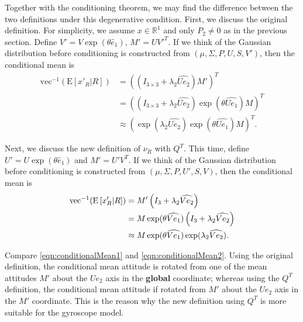 \documentclass[10pt,twocolumn]{article}
\newcommand{\expect}[1]{\ensuremath{\mathrm{E}\left[ #1 \right]}}
\newcommand{\real}[1]{\ensuremath{\mathbb{R}^{ #1 }}}
\begin{document}
Together with the conditioning theorem, we may find the difference between the two definitions under this degenerative condition.
First, we discuss the original definition.
For simplicity, we assume $x\in\real{1}$ and only $P_2 \neq 0$ as in the previous section.
Define $V'=V\exp(\theta\hat{e}_1)$, $M'=UV'^T$.
If we think of the Gaussian distribution before conditioning is constructed from $(\mu,\Sigma,P,U,S,V')$, then the conditional mean is
\begin{align} \label{eqn:conditionalMean1}
	\mathrm{vec}^{-1}(\expect{x'_R \lvert R}) &= \left( \left( I_{3\times 3} + \lambda_2\widehat{Ue_2} \right)M' \right)^T \nonumber \\
	&= \left( \left( I_{3\times 3} + \lambda_2\widehat{Ue_2} \right) \exp(\theta\widehat{Ue_1})M \right)^T \nonumber \\
	&\approx \left( \exp(\lambda_2\widehat{Ue_2})\exp(\theta\widehat{Ue_1})M \right)^T.
\end{align}

Next, we discuss the new definition of $\nu_R$ with $Q^T$.
This time, define $U' = U\exp(\theta\hat{e}_1)$ and $M'=U'V^T$.
If we think of the Gaussian distribution before conditioning is constructed from $(\mu,\Sigma,P,U',S,V)$, then the conditional mean is
\begin{align} \label{eqn:conditionalMean2}
	\mathrm{vec}^{-1}(\expect{x'_R \lvert R}) &= M'\left( I_{3\time 3} + \lambda_2\widehat{Ve_2} \right) \nonumber \\
	&= M\exp(\theta\widehat{Ve_1})\left( I_{3\time 3} + \lambda_2\widehat{Ve_2} \right) \nonumber \\
	&\approx M\exp(\theta\widehat{Ve_1})\exp(\lambda_2\widehat{Ve_2}).
\end{align}

Compare \eqref{eqn:conditionalMean1} and \eqref{eqn:conditionalMean2}.
Using the original definition, the conditional mean attitude is rotated from one of the mean attitudes $M'$ about the $Ue_2$ axis in the \textbf{global} coordinate;
whereas using the $Q^T$ definition, the conditional mean attitude if rotated from $M'$ about the $Ue_2$ axis in the $M'$ coordinate.
This is the reason why the new definition using $Q^T$ is more suitable for the gyroscope model.
\end{document}
